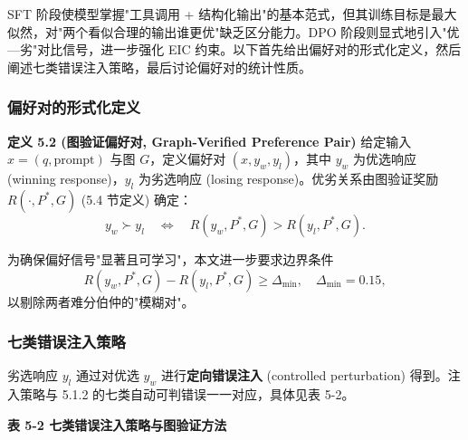 \documentclass[a4paper,12pt]{ctexart}
\begin{document}
SFT 阶段使模型掌握"工具调用 + 结构化输出"的基本范式，但其训练目标是最大似然，对"两个看似合理的输出谁更优"缺乏区分能力。DPO 阶段则显式地引入"优—劣"对比信号，进一步强化 EIC 约束。以下首先给出偏好对的形式化定义，然后阐述七类错误注入策略，最后讨论偏好对的统计性质。

\subsubsection{偏好对的形式化定义}

\textbf{定义 5.2 (图验证偏好对, Graph-Verified Preference Pair)} 给定输入 $x=(q,\text{prompt})$ 与图 $G$，定义偏好对 $(x,y_w,y_l)$，其中 $y_w$ 为优选响应 (winning response)，$y_l$ 为劣选响应 (losing response)。优劣关系由图验证奖励 $R(\cdot,P^*,G)$ (5.4 节定义) 确定：
\[y_w \succ y_l \quad\Longleftrightarrow\quad R(y_w,P^*,G) > R(y_l,P^*,G).\]

为确保偏好信号"显著且可学习"，本文进一步要求边界条件
\[R(y_w,P^*,G)-R(y_l,P^*,G)\geq \Delta_{\min},\quad \Delta_{\min}=0.15,\]
以剔除两者难分伯仲的"模糊对"。

\subsubsection{七类错误注入策略}

劣选响应 $y_l$ 通过对优选 $y_w$ 进行\textbf{定向错误注入} (controlled perturbation) 得到。注入策略与 5.1.2 的七类自动可判错误一一对应，具体见表 5-2。

\textbf{表 5-2 七类错误注入策略与图验证方法}
\end{document}
